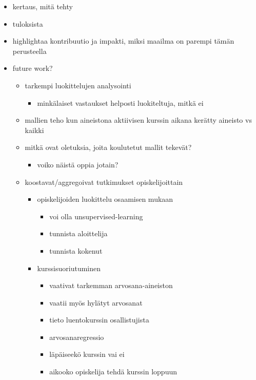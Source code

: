 \begin{itemize}
    \item kertaus, mitä tehty
    \item tuloksista
    \item highlightaa kontribuutio ja impakti, miksi maailma on parempi tämän perusteella
    \item future work?
    \begin{itemize}
        \item tarkempi luokittelujen analysointi
        \begin{itemize}
            \item minkälaiset vastaukset helposti luokiteltuja, mitkä ei
        \end{itemize}
        \item mallien teho kun aineistona aktiivisen kurssin aikana kerätty aineisto vs kaikki
        \item mitkä ovat oletuksia, joita koulutetut mallit tekevät?
        \begin{itemize}
            \item voiko näistä oppia jotain?
        \end{itemize}
        \item koostavat/aggregoivat tutkimukset opiskelijoittain
        \begin{itemize}
            \item opiskelijoiden luokittelu osaamisen mukaan
            \begin{itemize}
                \item voi olla unsupervised-learning
            \end{itemize}
            \begin{itemize}
                \item tunnista aloittelija
                \item tunnista kokenut
            \end{itemize}
            \item kurssisuoriutuminen
            \begin{itemize}
                \item vaativat tarkemman arvosana-aineiston
                \item vaatii myös hylätyt arvosanat
                \item tieto luentokurssin osallistujista
                \item arvosanaregressio
                \item läpäiseekö kurssin vai ei
                \item aikooko opiskelija tehdä kurssin loppuun
            \end{itemize}
        \end{itemize}
    \end{itemize}
\end{itemize}

